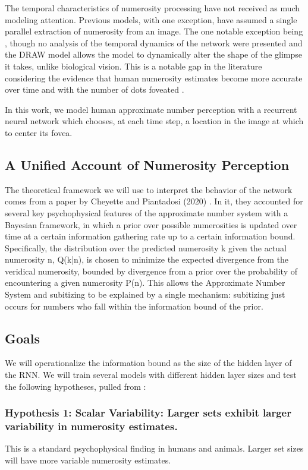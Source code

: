 \documentclass{article}
\begin{document}
The temporal characteristics of numerosity processing have not received as much modeling attention. Previous models, with one exception, have assumed a single parallel extraction of numerosity from an image. The one notable exception being \cite{mcclelland}, though no analysis of the temporal dynamics of the network were presented and the DRAW model allows the model to dynamically alter the shape of the glimpse it takes, unlike biological vision. This is a notable gap in the literature considering the evidence that human numerosity estimates become more accurate over time \cite{gilmore} and with the number of dots foveated \cite{accumulator}.

In this work, we model human approximate number perception with a recurrent neural network which chooses, at each time step, a location in the image at which to center its fovea.

\subsection{A Unified Account of Numerosity Perception}
The theoretical framework we will use to interpret the behavior of the network comes from a paper by Cheyette and Piantadosi (2020) \cite{unified}. In it, they accounted for several key psychophysical features of the approximate number system with a Bayesian framework, in which a prior over possible numerosities is updated over time at a certain information gathering rate up to a certain information bound. Specifically, the distribution over the predicted numerosity k given the actual numerosity n, Q(k|n), is chosen to minimize the expected divergence from the veridical numerosity, bounded by divergence from a prior over the probability of encountering a given numerosity P(n). This allows the Approximate Number System and subitizing to be explained by a single mechanism: subitizing just occurs for numbers who fall within the information bound of the prior.
\subsection{Goals}
We will operationalize the information bound as the size of the hidden layer of the RNN. We will train several models with different hidden layer sizes and test the following hypotheses, pulled from \cite{unified}:
\subsubsection{Hypothesis 1: Scalar Variability: Larger sets exhibit larger variability in numerosity estimates.}
This is a standard psychophysical finding in humans and animals. Larger set sizes will have more variable numerosity estimates.
\end{document}
